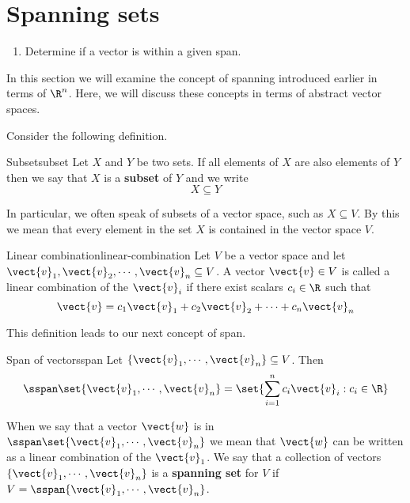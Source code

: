 \section{Spanning sets}

\begin{outcome}
  \begin{enumerate}
  \item Determine if a vector is within a given span.
  \end{enumerate}
\end{outcome}

In this section we will examine the concept of spanning introduced earlier in terms of $\R^n$. Here, we will discuss these concepts in terms of abstract vector spaces. 

Consider the following definition. 

\begin{definition}{Subset}{subset}
Let $X$ and $Y$ be two sets. If all elements of $X$ are also elements of $Y$ then we say that $X$ is a \textbf{subset} of $Y$ and we write
\[
X \subseteq Y
\]
\end{definition}

In particular, we often speak of subsets of a vector space, such as $X \subseteq V$. By this we mean that every element in the set $X$ is contained in the vector space $V$. 

\begin{definition}{Linear combination}{linear-combination}
Let $V$ be a vector space and let $\vect{v}_1, \vect{v}_2, \cdots, \vect{v}_n \subseteq V$. A vector $\vect{v} \in V$ is called a linear combination of the $\vect{v}_i$ if there exist scalars $c_i \in \R$ such that 
\[
\vect{v} = c_1 \vect{v}_1 + c_2 \vect{v}_2 + \cdots + c_n \vect{v}_n
\]
\end{definition}

This definition leads to our next concept of span.

\begin{definition}{Span of vectors}{span}
Let $\{\vect{v}_{1},\cdots ,\vect{v}_{n}\} \subseteq V$. Then
\begin{equation*}
\sspan\set{\vect{v}_{1},\cdots ,\vect{v}_{n}} = 
\set{\sum_{i=1}^{n}c_{i}\vect{v}_{i}: c_{i}\in \R
} 
\end{equation*}
\end{definition}

When we say that a vector $\vect{w}$ is in $\sspan\set{\vect{v}_{1},\cdots ,\vect{v}_{n}}$ we mean that $\vect{w}$ can be written as a linear combination of the $\vect{v}_1$. We say that a collection of vectors $\{\vect{v}_{1},\cdots ,\vect{v}_{n}\}$ is a \textbf{spanning set} for $V$ if $V = \sspan \{\vect{v}_{1},\cdots ,\vect{v}_{n}\}$. 

